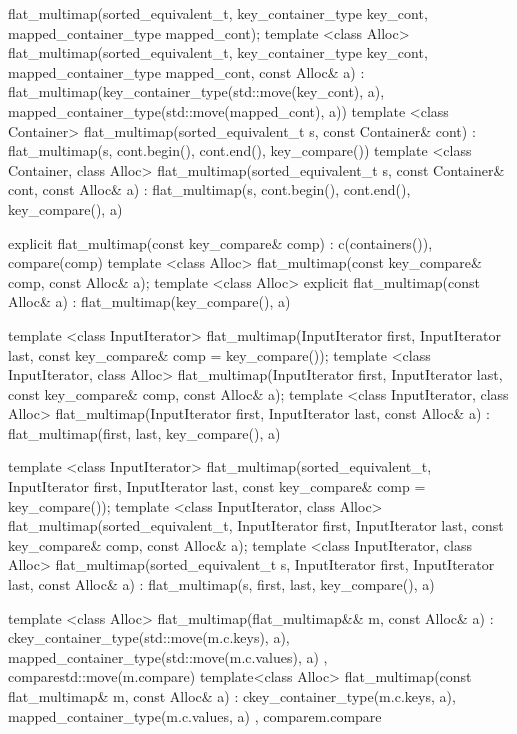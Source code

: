 \begin{codeblock}
\begin{codeblock}
\begin{codeblock}
\begin{addedblock}
\begin{codeblock}
{{    flat_multimap(sorted_equivalent_t,
                  key_container_type key_cont, mapped_container_type mapped_cont);
    template <class Alloc>
    flat_multimap(sorted_equivalent_t, key_container_type key_cont,
                  mapped_container_type mapped_cont, const Alloc& a)
        : flat_multimap(key_container_type(std::move(key_cont), a),
                        mapped_container_type(std::move(mapped_cont), a))
      { }
    template <class Container>
      flat_multimap(sorted_equivalent_t s, const Container& cont)
        : flat_multimap(s, cont.begin(), cont.end(), key_compare()) { }
    template <class Container, class Alloc>
      flat_multimap(sorted_equivalent_t s, const Container& cont, const Alloc& a)
        : flat_multimap(s, cont.begin(), cont.end(), key_compare(), a) { }

    explicit flat_multimap(const key_compare& comp)
      : c(containers()), compare(comp) { }
    template <class Alloc>
      flat_multimap(const key_compare& comp, const Alloc& a);
    template <class Alloc>
      explicit flat_multimap(const Alloc& a)
        : flat_multimap(key_compare(), a) { }

    template <class InputIterator>
      flat_multimap(InputIterator first, InputIterator last,
                    const key_compare& comp = key_compare());
    template <class InputIterator, class Alloc>
      flat_multimap(InputIterator first, InputIterator last,
                    const key_compare& comp, const Alloc& a);
    template <class InputIterator, class Alloc>
      flat_multimap(InputIterator first, InputIterator last,
                    const Alloc& a)
        : flat_multimap(first, last, key_compare(), a) { }

    template <class InputIterator>
      flat_multimap(sorted_equivalent_t, InputIterator first, InputIterator last,
                    const key_compare& comp = key_compare());
    template <class InputIterator, class Alloc>
      flat_multimap(sorted_equivalent_t, InputIterator first, InputIterator last,
                    const key_compare& comp, const Alloc& a);
    template <class InputIterator, class Alloc>
      flat_multimap(sorted_equivalent_t s, InputIterator first, InputIterator last,
                    const Alloc& a)
        : flat_multimap(s, first, last, key_compare(), a) { }

    template <class Alloc>
      flat_multimap(flat_multimap&& m, const Alloc& a)
        : c{key_container_type(std::move(m.c.keys), a),
            mapped_container_type(std::move(m.c.values), a)}
        , compare{std::move(m.compare)}
      { }
    template<class Alloc>
      flat_multimap(const flat_multimap& m, const Alloc& a)
        : c{key_container_type(m.c.keys, a), mapped_container_type(m.c.values, a)}
        , compare{m.compare}
      { }

}}
\end{codeblock}
\end{addedblock}
\end{codeblock}
\end{codeblock}
\end{codeblock}
